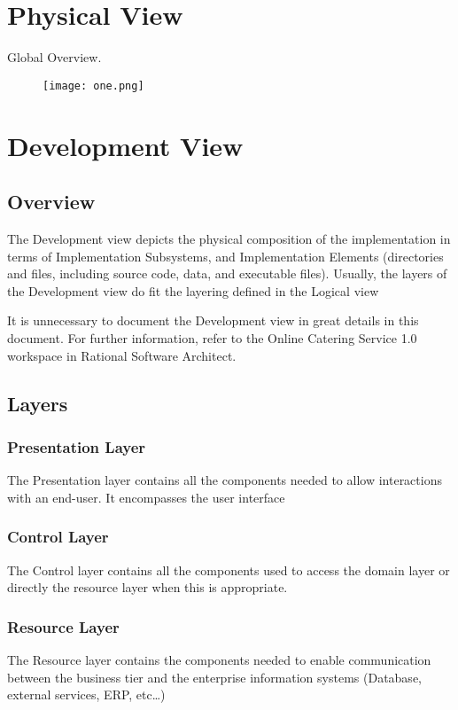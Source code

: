 \documentclass[10pt,a4paper]{article}
\begin{document}
\section{Physical View}
Global Overview.
\begin{figure}[H]
\texttt{[image: one.png]}
\end{figure}

\section{Development  View} 
\subsection{ Overview}

The Development view depicts the physical composition of the implementation in terms of Implementation Subsystems, and Implementation Elements (directories and files, including source code, data, and executable files). 
Usually, the layers of the Development view do fit the layering defined in the Logical view

It is unnecessary to document the Development view in great details in this document. For further information, refer to the Online Catering Service 1.0 workspace in Rational Software Architect. 

\subsection{Layers}

\subsubsection{Presentation Layer}
The Presentation layer contains all the components needed to allow interactions with an end-user. It encompasses the user interface 
\subsubsection{	Control Layer}
The Control layer contains all the components used to access the domain layer or directly the resource layer when this is appropriate. 

\subsubsection{	Resource Layer}
The Resource layer contains the components needed to enable communication between the business tier and the enterprise information systems (Database, external services, ERP, etc…)
\end{document}
